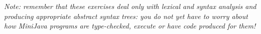 \documentclass[11pt]{article}
\begin{document}
\begin{enumerate}
\end{enumerate}

\bigskip\noindent
{\em Note: remember that these exercises deal only with lexical and 
syntax analysis and producing appropriate abstract syntax trees: you do
not yet have to worry about how MiniJava programs are type-checked,
execute or have code produced for them!}
\end{document}
